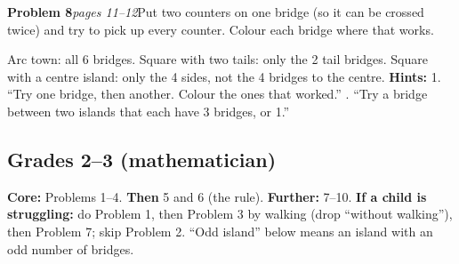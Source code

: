 \documentclass[10pt]{article}
\newcommand{\kprob}[3]{\par\needspace{14\baselineskip}\vspace{3pt}\noindent\textbf{#1}\enspace\textit{#2}\enspace #3\par}
\newcommand{\hints}[1]{\noindent\textbf{Hints:} #1\par}
\begin{document}
\kprob{Problem 8}{pages 11--12}{Put two counters on one bridge (so it can be crossed twice) and try to pick up every counter. Colour each bridge where that works.}

Arc town: all 6 bridges. Square with two tails: only the 2 tail bridges. Square with a centre island: only the 4 sides, not the 4 bridges to the centre.
\hints{1. ``Try one bridge, then another. Colour the ones that worked.'' \;2. ``Try a bridge between two islands that each have 3 bridges, or 1.''}

\subsection{Grades 2--3 (mathematician)}

\textbf{Core:} Problems 1--4. \textbf{Then} 5 and 6 (the rule). \textbf{Further:} 7--10. \textbf{If a child is struggling:} do Problem 1, then Problem 3 by walking (drop ``without walking''), then Problem 7; skip Problem 2. ``Odd island'' below means an island with an odd number of bridges.
\end{document}
